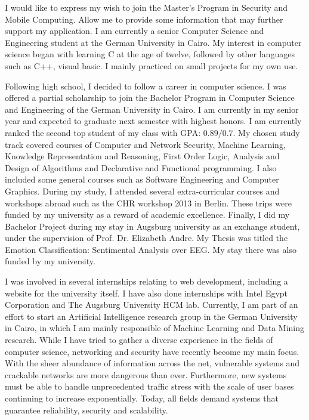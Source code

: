 \documentclass[10pt,stdletter,dateno,sigleft]{newlfm} %
\begin{document}
\begin{newlfm}


  I would like to express my wish to join the Master's Program in Security and
  Mobile Computing. Allow me to provide some information that may further support my application.
  I am currently a senior Computer Science and Engineering student at the German
  University in Cairo.  My interest in computer science began with learning C at the age of twelve,
  followed by other languages such as C++, visual basic. I mainly practiced on
  small projects for my own use.  

  Following high school, I decided to follow a career in computer science. I was
  offered a partial scholarship to join the Bachelor Program in Computer Science
  and Engineering of the German University in Cairo. I am currently in my senior
  year and expected to graduate next semester with highest honors. I am
  currently ranked the second top student of my class with GPA: $0.89/0.7$. My
  chosen study track covered courses of Computer and Network Security, Machine Learning, Knowledge
  Representation and Reasoning, First Order Logic, Analysis and Design of
  Algorithms and Declarative and Functional
  programming. I also included some general courses such as Software Engineering
  and Computer Graphics. During my study, I attended several extra-curricular courses and
  workshops abroad such as the CHR workshop 2013 in Berlin. These trips were
  funded by my university as a reward of academic excellence. Finally, I did my
  Bachelor Project during my stay in Augsburg university as an exchange student,
  under the supervision of Prof. Dr. Elizabeth Andre. My Thesis was titled the
  Emotion Classification: Sentimental Analysis over EEG. My stay there was also
  funded by my university.

  I was involved in several internships relating to web development,
  including a website for the university itself. I have also done internships
  with Intel Egypt Corporation and The Augsburg University HCM lab. Currently,
  I am part of an effort to start an Artificial
  Intelligence research group in the German University in Cairo, in which I am
  mainly responsible of Machine Learning and Data Mining research. While I have
  tried to gather a diverse experience in the fields of computer science,
  networking and security have recently become my main focus. With the sheer
  abundance of information across the net, vulnerable systems and crackable
  networks are more dangerous than ever. Furthermore, new systems must be able
  to handle unprecedented traffic stress with the scale of user bases continuing
  to increase exponentially. Today, all fields demand systems that
  guarantee reliability, security and scalability. 


\end{newlfm}
\end{document}
